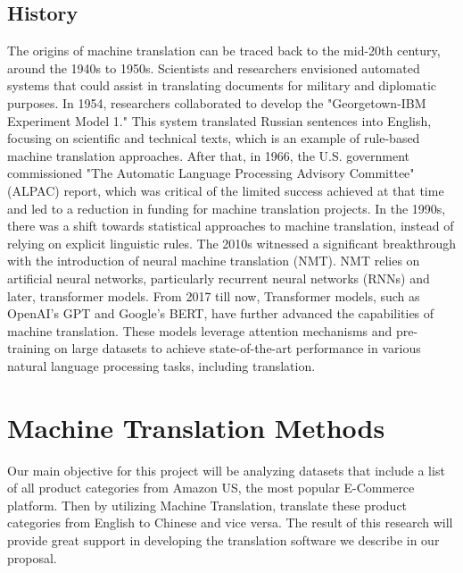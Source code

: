 \documentclass[sigconf]{acmart}
\begin{document}
    \subsection{History} 
    The origins of machine translation can be traced back to the mid-20th century, around the 1940s to 1950s. Scientists and researchers envisioned automated systems that could assist in translating documents for military and diplomatic purposes. In 1954, researchers collaborated to develop the "Georgetown-IBM Experiment Model 1." This system translated Russian sentences into English, focusing on scientific and technical texts, which is an example of rule-based machine translation approaches. After that, in 1966, the U.S. government commissioned "The Automatic Language Processing Advisory Committee" (ALPAC) report, which was critical of the limited success achieved at that time and led to a reduction in funding for machine translation projects. In the 1990s, there was a shift towards statistical approaches to machine translation, instead of relying on explicit linguistic rules. The 2010s witnessed a significant breakthrough with the introduction of neural machine translation (NMT). NMT relies on artificial neural networks, particularly recurrent neural networks (RNNs) and later, transformer models. From 2017 till now, Transformer models, such as OpenAI's GPT and Google's BERT, have further advanced the capabilities of machine translation. These models leverage attention mechanisms and pre-training on large datasets to achieve state-of-the-art performance in various natural language processing tasks, including translation.

\section{Machine Translation Methods} %
    Our main objective for this project will be analyzing datasets that include a list of all product categories from Amazon US, the most popular E-Commerce platform. Then by utilizing Machine Translation, translate these product categories from English to Chinese and vice versa. The result of this research will provide great support in developing the translation software we describe in our proposal.
    
\end{document}
